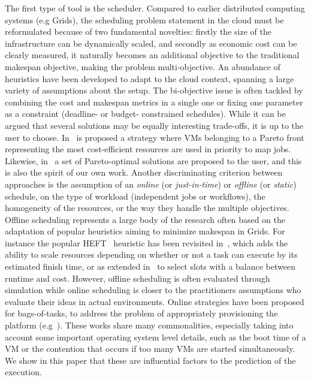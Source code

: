 \documentclass[10pt,conference,compsocconf]{IEEEtran}
\begin{document}
The first type of tool is the scheduler. Compared to earlier distributed
computing systems  (e.g Grids),  the scheduling problem  statement in  the cloud
must be reformulated because of two fundamental novelties: firstly the size of the
infrastructure can be dynamically scaled, and secondly as economic cost can be
clearly measured, it naturally becomes an additional objective to the traditional
makespan  objective,  making  the   problem  multi-objective.   An abundance  of
heuristics have been  developed to adapt to the cloud  context, spanning a large
variety of assumptions about the setup.  The bi-objective issue is often tackled
by  combining the  cost and  makespan  metrics in  a  single one  or fixing  one
parameter as a constraint (deadline- or budget- constrained schedules). While it
can be argued  that several solutions may be equally  interesting trade-offs,
it is up to the user to choose.  In~\cite{Su13} is proposed a strategy where VMs
belonging to a  Pareto front representing the most  cost-efficient resources are
used  in  priority  to  map  jobs.  Likewise,  in~\cite{Durillo14}  a  set  of
Pareto-optimal solutions are  proposed to the user, and this  is also the spirit
of our  own work.   Another discriminating criterion  between approaches  is the
assumption of  an \emph{online}  (or \emph{just-in-time}) or  \emph{offline} (or
\emph{static})  schedule,  on   the  type  of  workload   (independent  jobs  or
workflows),  the homogeneity  of  the resources,  or the  way  they handle  the
multiple objectives.  Offline scheduling represents a large body of the research 
often based  on the adaptation of popular heuristics  aiming to minimize
makespan in Grids.  For instance  the popular HEFT~\cite{Zhao2003} heuristic has
been  revisited in~\cite{LinL11},  which  adds the  ability  to scale  resources
depending on whether or not a task  can execute by its estimated finish time, or
as extended in~\cite{Li11cost-conscious} to select  slots with a balance between
runtime  and  cost.  However,  offline  scheduling  is often  evaluated  through
simulation while online scheduling is closer to the practitioners assumptions 
who evaluate  their ideas  in actual environments.   Online strategies have been
proposed  for  bags-of-tasks, to address  the problem  of  appropriately
provisioning                             the                            platform
(e.g~\cite{MarshallKF10,GenaudG11,DuongLG11,VillegasASI12}).  These  works share
many  commonalities, especially taking  into account  some important  operating
system level details, such as the boot time of a VM or the contention that occurs
if too many VMs are started simultaneously. We show in this paper that these are
influential factors to the prediction of the execution.
\end{document}
